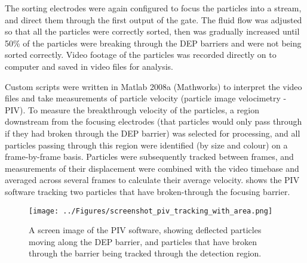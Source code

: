 The sorting electrodes were again configured to focus the particles into a stream, and direct them through the first output of the gate. The fluid flow was adjusted so that all the particles were correctly sorted, then was gradually increased until 50\% of the particles were breaking through the DEP barriers and were not being sorted correctly. Video footage of the particles was recorded directly on to computer and saved in video files for analysis. 

Custom scripts were written in Matlab 2008a (Mathworks) to interpret the video files and take measurements of particle velocity (particle image velocimetry - PIV). To measure the breakthrough velocity of the particles, a region downstream from the focusing electrodes (that particles would only pass through if they had broken through the DEP barrier) was selected for processing, and all particles passing through this region were identified (by size and colour) on a frame-by-frame basis. Particles were subsequently tracked between frames, and measurements of their displacement were combined with the video timebase and averaged across several frames to calculate their average velocity.  shows the PIV software tracking two particles that have broken-through the focusing barrier.

\begin{figure}
 \centering
 \texttt{[image: ../Figures/screenshot\_piv\_tracking\_with\_area.png]}
 \caption[A screen image of the PIV software, showing deflected particles moving along the DEP barrier.]{A screen image of the PIV software, showing deflected particles moving along the DEP barrier, and particles that have broken through the barrier being tracked through the detection region.}
 \label{fig:screenshot_piv_tracking_with_area}
\end{figure}


